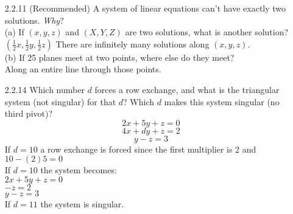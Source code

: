 \documentclass[10pt,twoside,reqno]{article}
\begin{document}
\begin{enumerate}
\item[2.2.11](Recommended) A system of linear equations can't have exactly two solutions. \textit{Why}? \\
\vspace{3mm}
\hspace{10pt}(a) If $(x, y, z)$ and $(X, Y, Z)$ are two solutions, what is another solution?\\
\vspace{3mm}
$(\frac{1}{2}x, \frac{1}{2}y, \frac{1}{2}z)$ There are infinitely many solutions along $(x, y, z)$.\\ 
\vspace{3mm}
\hspace{10pt}(b) If 25 planes meet at two points, where else do they meet? \\
\vspace{3mm}
Along an entire line through those points.
\item[2.2.14]Which number $d$ forces a row exchange, and what is the triangular system (not singular) for that $d$? Which $d$ makes this system singular (no third pivot)?
$$2x + 5y + z = 0$$ $$4x + dy + z = 2$$ $$y -z = 3$$
If $d = 10$ a row exchange is forced since the first multiplier is 2 and $10 - (2)5 = 0$\\
If $d = 10$ the system becomes:\\
$2x + 5y + z = 0$\\
\hspace{38pt}$-z = 2$\\
\hspace{28pt}$y-z = 3$\\
If $d = 11$ the system is singular.\\


\end{enumerate}
\end{document}
